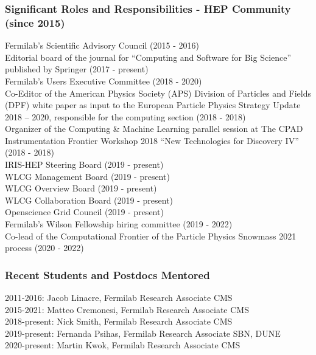 \documentclass[9pt]{extarticle}
\begin{document}
\subsubsection*{Significant Roles and Responsibilities - HEP Community (since 2015)}

Fermilab’s Scientific Advisory Council (2015 - 2016)\\
Editorial board of the journal for “Computing and Software for Big Science” published by Springer (2017 - present)\\
Fermilab’s Users Executive Committee (2018 - 2020)\\
Co-Editor of the American Physics Society (APS) Division of Particles and Fields (DPF) white paper as input to the European Particle Physics Strategy Update 2018 – 2020, responsible for the computing section (2018 - 2018) \\
Organizer of the Computing \& Machine Learning parallel session at The CPAD Instrumentation Frontier Workshop 2018 “New Technologies for Discovery IV” (2018 - 2018)\\
IRIS-HEP Steering Board (2019 - present)\\
WLCG Management Board (2019 - present)\\
WLCG Overview Board (2019 - present)\\
WLCG Collaboration Board (2019 - present)\\
Openscience Grid Council (2019 - present)\\
Fermilab’s Wilson Fellowship hiring committee (2019 - 2022)\\
Co-lead of the Computational Frontier of the Particle Physics Snowmass 2021 process (2020 - 2022)


\subsubsection*{Recent Students and Postdocs Mentored}

2011-2016: Jacob Linacre, Fermilab Research Associate CMS\\
2015-2021: Matteo Cremonesi, Fermilab Research Associate CMS\\
2018-present: Nick Smith, Fermilab Research Associate CMS\\
2019-present: Fernanda Psihas, Fermilab Research Associate SBN, DUNE\\
2020-present: Martin Kwok, Fermilab Research Associate CMS


\newpage
\end{document}
